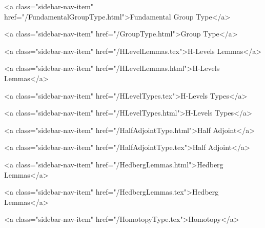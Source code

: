       
    
      
        
          <a class="sidebar-nav-item" href="/FundamentalGroupType.html">Fundamental Group Type</a>
        
      
    
      
        
          <a class="sidebar-nav-item" href="/GroupType.html">Group Type</a>
        
      
    
      
        
          <a class="sidebar-nav-item" href="/HLevelLemmas.tex">H-Levels Lemmas</a>
        
      
    
      
        
          <a class="sidebar-nav-item" href="/HLevelLemmas.html">H-Levels Lemmas</a>
        
      
    
      
        
          <a class="sidebar-nav-item" href="/HLevelTypes.tex">H-Levels Types</a>
        
      
    
      
        
          <a class="sidebar-nav-item" href="/HLevelTypes.html">H-Levels Types</a>
        
      
    
      
        
          <a class="sidebar-nav-item" href="/HalfAdjointType.html">Half Adjoint</a>
        
      
    
      
        
          <a class="sidebar-nav-item" href="/HalfAdjointType.tex">Half Adjoint</a>
        
      
    
      
        
          <a class="sidebar-nav-item" href="/HedbergLemmas.html">Hedberg Lemmas</a>
        
      
    
      
        
          <a class="sidebar-nav-item" href="/HedbergLemmas.tex">Hedberg Lemmas</a>
        
      
    
      
        
          <a class="sidebar-nav-item" href="/HomotopyType.tex">Homotopy</a>
        
